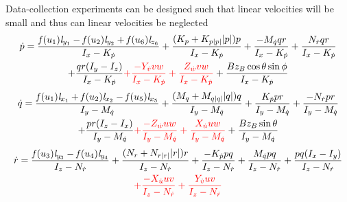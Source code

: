 \documentclass[11pt]{beamer}
\begin{document}
\begin{frame}[shrink]
Data-collection experiments can be designed such that linear velocities will be small and thus can linear velocities be neglected
\begin{multline*}
\dot{p} = \frac{\mathit{f}(u_{1}) \mathit{l}_{y_{1}} - \mathit{f}(u_{2}) \mathit{l}_{y_{2}} + \mathit{f}(u_{6}) \mathit{l}_{z_{6}}}{I_{x} - K_{\dot{p}}} + \frac{ (K_{p} + K_{p|p|} |p|)p}{I_{x} - K_{\dot{p}}}  + \frac{-M_{\dot{q}} q r}{I_{x} - K_{\dot{p}}} +  \frac{N_{\dot{r}} q r}{I_{x} - K_{\dot{p}}} \\ + \frac{q r (I_{y} - I_{z})}{I_{x} - K_{\dot{p}}} {\color{red} + \frac{- Y_{\dot{v}} v w}{I_{x} - K_{\dot{p}}} + \frac{Z_{\dot{w}} v w}{I_{x} - K_{\dot{p}}}} + \frac{B z_B \cos{\theta} \sin{\phi}}{I_{x} - K_{\dot{p}}}
\end{multline*}
\begin{multline*}
\dot{q} =\frac{\mathit{f}(u_{1}) \mathit{l}_{x_{1}} + \mathit{f}(u_{2}) \mathit{l}_{x_{2}} - \mathit{f}(u_{5}) \mathit{l}_{x_{5}}}{I_{y} - M_{\dot{q}}} + \frac{(M_{q} + M_{q|q|} |q|)q}{I_{y} - M_{\dot{q}}} + \frac{K_{\dot{p}} p r}{I_{y} - M_{\dot{q}}} + \frac{-N_{\dot{r}} p r}{I_{y} - M_{\dot{q}}} \\ +
\frac{p r (I_{z} - I_{x})}{I_{y} - M_{\dot{q}}} {\color{red} + \frac{-Z_{\dot{w}} u w}{I_{y} - M_{\dot{q}}} + \frac{X_{\dot{u}} u w}{I_{y} - M_{\dot{q}}}} + \frac{B z_B \sin{\theta} }{I_{y} - M_{\dot{q}}} 
\end{multline*}
\begin{multline*}
\dot{r} = \frac{\mathit{f}(u_{3}) \mathit{l}_{y_{3}} - \mathit{f}(u_{4}) \mathit{l}_{y_{4}}}{I_{z} - N_{\dot{r}}} + \frac{(N_{r} + N_{r|r|} |r|)r}{I_{z} - N_{\dot{r}}} + \frac{-K_{\dot{p}} p q}{I_{z} - N_{\dot{r}}} + \frac{M_{\dot{q}} p q}{I_{z} - N_{\dot{r}}} +
\frac{p q (I_{x} - I_{y})}{I_{z} - N_{\dot{r}}}\\ {\color{red} + \frac{- X_{\dot{u}} u v}{I_{z} - N_{\dot{r}}} + \frac{Y_{\dot{v}} u v}{I_{z} - N_{\dot{r}}}}
\end{multline*}
\end{frame}
\end{document}
